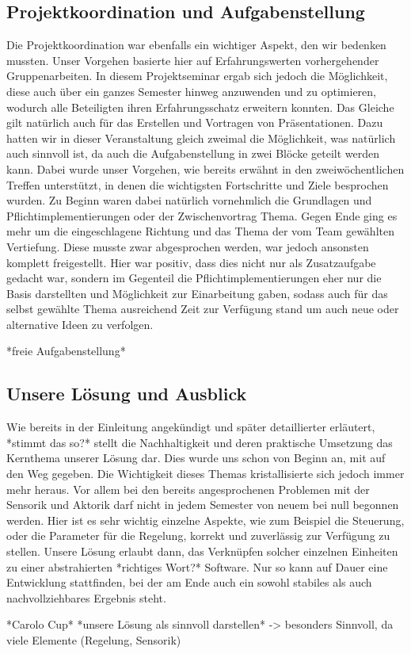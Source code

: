 \subsection{Projektkoordination und Aufgabenstellung}
Die Projektkoordination war ebenfalls ein wichtiger Aspekt, den wir bedenken mussten. Unser Vorgehen basierte hier auf Erfahrungswerten vorhergehender Gruppenarbeiten. In diesem Projektseminar ergab sich jedoch die Möglichkeit, diese auch über ein ganzes Semester hinweg anzuwenden und zu optimieren, wodurch alle Beteiligten ihren Erfahrungsschatz erweitern konnten. Das Gleiche gilt natürlich auch für das Erstellen und Vortragen von Präsentationen. Dazu hatten wir in dieser Veranstaltung gleich zweimal die Möglichkeit, was natürlich auch sinnvoll ist, da auch die Aufgabenstellung in zwei Blöcke geteilt werden kann. Dabei wurde unser Vorgehen, wie bereits erwähnt in den zweiwöchentlichen Treffen unterstützt, in denen die wichtigsten Fortschritte und Ziele besprochen wurden. Zu Beginn waren dabei natürlich vornehmlich die Grundlagen und Pflichtimplementierungen oder der Zwischenvortrag Thema. Gegen Ende ging es mehr um die eingeschlagene Richtung und das Thema der vom Team gewählten Vertiefung. Diese musste zwar abgesprochen werden, war jedoch ansonsten komplett freigestellt. Hier war positiv, dass dies nicht nur als Zusatzaufgabe gedacht war, sondern im Gegenteil die Pflichtimplementierungen eher nur die Basis darstellten und Möglichkeit zur Einarbeitung gaben, sodass auch für das selbst gewählte Thema ausreichend Zeit zur Verfügung stand um auch neue oder alternative Ideen zu verfolgen.

*freie Aufgabenstellung*

\subsection{Unsere Lösung und Ausblick}
Wie bereits in der Einleitung angekündigt und später detaillierter erläutert, *stimmt das so?* stellt die Nachhaltigkeit und deren praktische Umsetzung das Kernthema unserer Lösung dar. Dies wurde uns schon von Beginn an, mit auf den Weg gegeben. Die Wichtigkeit dieses Themas kristallisierte sich jedoch immer mehr heraus. Vor allem bei den bereits angesprochenen Problemen mit der Sensorik und Aktorik darf nicht in jedem Semester von neuem bei null begonnen werden. Hier ist es sehr wichtig einzelne Aspekte, wie zum Beispiel die Steuerung, oder die Parameter für die Regelung, korrekt und zuverlässig zur Verfügung zu stellen. Unsere Lösung erlaubt dann, das Verknüpfen solcher einzelnen Einheiten zu einer abstrahierten *richtiges Wort?* Software. Nur so kann auf Dauer eine Entwicklung stattfinden, bei der am Ende auch ein sowohl stabiles als auch nachvollziehbares Ergebnis steht.

*Carolo Cup*
*unsere Lösung als sinnvoll darstellen* -> besonders Sinnvoll, da viele Elemente (Regelung, Sensorik)
